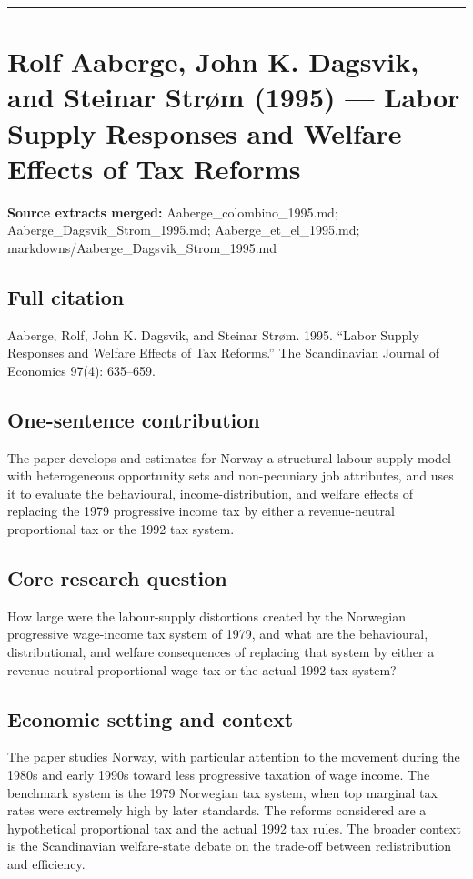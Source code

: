 \documentclass[11pt,a4paper]{article}
\begin{document}
\medskip\hrule\medskip

\section*{Rolf Aaberge, John K. Dagsvik, and Steinar Strøm (1995) — Labor Supply Responses and Welfare Effects of Tax Reforms}

\textbf{Source extracts merged:} Aaberge\_colombino\_1995.md; Aaberge\_Dagsvik\_Strom\_1995.md; Aaberge\_et\_el\_1995.md; markdowns/Aaberge\_Dagsvik\_Strom\_1995.md

\subsection*{Full citation}
Aaberge, Rolf, John K. Dagsvik, and Steinar Strøm. 1995. “Labor Supply Responses and Welfare Effects of Tax Reforms.” The Scandinavian Journal of Economics 97(4): 635–659.

\subsection*{One-sentence contribution}
The paper develops and estimates for Norway a structural labour-supply model with heterogeneous opportunity sets and non-pecuniary job attributes, and uses it to evaluate the behavioural, income-distribution, and welfare effects of replacing the 1979 progressive income tax by either a revenue-neutral proportional tax or the 1992 tax system.

\subsection*{Core research question}
How large were the labour-supply distortions created by the Norwegian progressive wage-income tax system of 1979, and what are the behavioural, distributional, and welfare consequences of replacing that system by either a revenue-neutral proportional wage tax or the actual 1992 tax system?

\subsection*{Economic setting and context}
The paper studies Norway, with particular attention to the movement during the 1980s and early 1990s toward less progressive taxation of wage income. The benchmark system is the 1979 Norwegian tax system, when top marginal tax rates were extremely high by later standards. The reforms considered are a hypothetical proportional tax and the actual 1992 tax rules. The broader context is the Scandinavian welfare-state debate on the trade-off between redistribution and efficiency.
\end{document}

